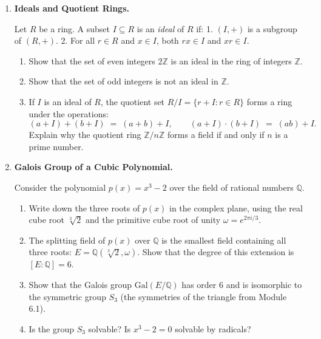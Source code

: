 \documentclass[12pt, a4paper]{article}
\newcommand{\newterm}[1]{\textit{\textcolor{DiscoveryColor}{#1}}}
\begin{document}
\begin{enumerate}[label=\textbf{P\arabic*.}]
  \item \textbf{Ideals and Quotient Rings.}
  
        Let $R$ be a ring. A subset $I \subseteq R$ is an \newterm{ideal} of $R$ if:
        1. $(I, +)$ is a subgroup of $(R, +)$.
        2. For all $r \in R$ and $x \in I$, both $rx \in I$ and $xr \in I$.
        
        \begin{enumerate}[label=(\alph*)]
          \item Show that the set of even integers $2\mathbb{Z}$ is an ideal in the ring of integers $\mathbb{Z}$.
          \item Show that the set of odd integers is not an ideal in $\mathbb{Z}$.
          \item If $I$ is an ideal of $R$, the quotient set $R/I = \{r + I : r \in R\}$ forms a ring under the operations:
          \[
            (a+I) + (b+I) \;=\; (a+b)+I, \qquad (a+I)\cdot(b+I) \;=\; (ab)+I.
          \]
          Explain why the quotient ring $\mathbb{Z}/n\mathbb{Z}$ forms a field if and only if $n$ is a prime number.
        \end{enumerate}

  \item \textbf{Galois Group of a Cubic Polynomial.}
  
        Consider the polynomial $p(x) = x^3 - 2$ over the field of rational numbers $\mathbb{Q}$.
        \begin{enumerate}[label=(\alph*)]
          \item Write down the three roots of $p(x)$ in the complex plane, using the real cube root $\sqrt[3]{2}$ and the primitive cube root of unity $\omega = e^{2\pi i / 3}$.
          \item The splitting field of $p(x)$ over $\mathbb{Q}$ is the smallest field containing all three roots: $E = \mathbb{Q}(\sqrt[3]{2}, \omega)$.
                Show that the degree of this extension is $[E:\mathbb{Q}] = 6$.
          \item Show that the Galois group $\text{Gal}(E/\mathbb{Q})$ has order 6 and is isomorphic to the symmetric group $S_3$ (the symmetries of the triangle from Module 6.1).
          \item Is the group $S_3$ solvable? Is $x^3 - 2 = 0$ solvable by radicals?
        \end{enumerate}
\end{enumerate}
\end{document}
